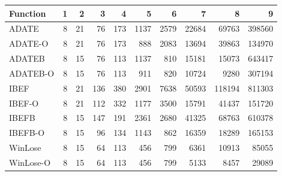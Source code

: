 \begin{table}[ht]
\centering
\begin{tabular}{lrrrrrrrrr}
  \hline
Function & 1 & 2 & 3 & 4 & 5 & 6 & 7 & 8 & 9 \\ 
  \hline
ADATE &   8 &  21 &  76 & 173 & 1137 & 2579 & 22684 & 69763 & 398560 \\ 
  ADATE-O &   8 &  21 &  76 & 173 & 888 & 2083 & 13694 & 39863 & 134970 \\ 
  ADATEB &   8 &  15 &  76 & 113 & 1137 & 810 & 15181 & 15073 & 643417 \\ 
  ADATEB-O &   8 &  15 &  76 & 113 & 911 & 820 & 10724 & 9280 & 307194 \\ 
  IBEF &   8 &  21 & 136 & 380 & 2901 & 7638 & 50593 & 118194 & 811303 \\ 
  IBEF-O &   8 &  21 & 112 & 332 & 1177 & 3500 & 15791 & 41437 & 151720 \\ 
  IBEFB &   8 &  15 & 147 & 191 & 2361 & 2680 & 41325 & 68763 & 610378 \\ 
  IBEFB-O &   8 &  15 &  96 & 134 & 1143 & 862 & 16359 & 18289 & 165153 \\ 
  WinLose &   8 &  15 &  64 & 113 & 456 & 799 & 6361 & 10913 & 85055 \\ 
  WinLose-O &   8 &  15 &  64 & 113 & 456 & 799 & 5133 & 8457 & 29089 \\ 
   \hline
\end{tabular}
\end{table}
